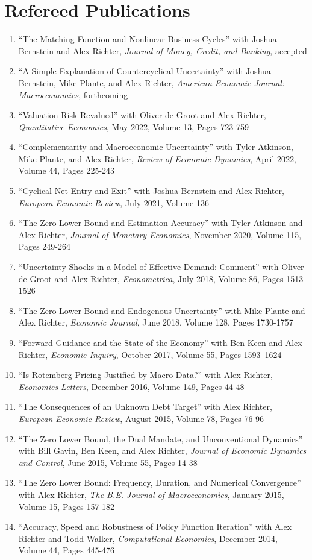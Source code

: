 \documentclass[10pt,letterpaper,en-US]{article}
\begin{document}
\section*{Refereed Publications}
\begin{enumerate}
\item ``The Matching Function and Nonlinear Business Cycles'' with Joshua Bernstein and Alex Richter, \emph{Journal of Money, Credit, and Banking}, accepted
\item ``A Simple Explanation of Countercyclical Uncertainty'' with Joshua Bernstein, Mike Plante, and Alex Richter, \emph{American Economic Journal: Macroeconomics}, forthcoming
\item ``Valuation Risk Revalued'' with Oliver de Groot and Alex Richter, \emph{Quantitative Economics}, May 2022, Volume 13, Pages 723-759
\item ``Complementarity and Macroeconomic Uncertainty'' with Tyler Atkinson, Mike Plante, and Alex Richter, \emph{Review of Economic Dynamics}, April 2022, Volume 44, Pages 225-243
\item ``Cyclical Net Entry and Exit'' with Joshua Bernstein and Alex Richter, \emph{European Economic Review}, July 2021, Volume 136
\item ``The Zero Lower Bound and Estimation Accuracy'' with Tyler Atkinson and Alex Richter, \emph{Journal of Monetary Economics}, November 2020, Volume 115, Pages 249-264
\item ``Uncertainty Shocks in a Model of Effective Demand: Comment'' with Oliver de Groot and Alex Richter, \emph{Econometrica}, July 2018, Volume 86, Pages 1513-1526
\item ``The Zero Lower Bound and Endogenous Uncertainty'' with Mike Plante and Alex Richter, \emph{Economic Journal}, June 2018, Volume 128, Pages 1730-1757
\item ``Forward Guidance and the State of the Economy'' with Ben Keen and Alex Richter, \emph{Economic Inquiry}, October 2017, Volume 55, Pages 1593–1624
\item ``Is Rotemberg Pricing Justified by Macro Data?'' with Alex Richter, \emph{Economics Letters}, December 2016, Volume 149, Pages 44-48
\item ``The Consequences of an Unknown Debt Target'' with Alex Richter, \emph{European Economic Review}, August 2015, Volume 78, Pages 76-96
\item ``The Zero Lower Bound, the Dual Mandate, and Unconventional Dynamics'' with Bill Gavin, Ben Keen, and Alex Richter, \emph{Journal of Economic Dynamics and Control}, June 2015, Volume 55, Pages 14-38
\item ``The Zero Lower Bound: Frequency, Duration, and Numerical Convergence'' with Alex Richter, \emph{The B.E. Journal of Macroeconomics}, January 2015, Volume 15, Pages 157-182
\item ``Accuracy, Speed and Robustness of Policy Function Iteration'' with Alex Richter and Todd Walker, \emph{Computational Economics}, December 2014, Volume 44, Pages 445-476
\end{enumerate}
\end{document}
